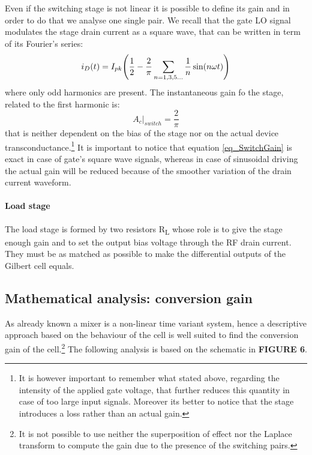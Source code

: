 Even if the switching stage is not linear it is possible to define its gain and in order to do that we analyse one single pair. We recall that the gate LO signal modulates the stage drain current as a square wave, that can be written in term of its Fourier's series:
\begin{equation}
 i_D(t)=I_{pk}\Bigg(\frac{1}{2}-\frac{2}{\pi} \sum_{n=1,3,5 \dots}^{} \frac{1}{n}\sin(n\omega t)\Bigg) \notag
\end{equation} 
where only odd harmonics are present. The instantaneous gain fo the stage, related to the first harmonic is:
\begin{equation}
\label{eq_SwitchGain}
A_c|_{switch} = \frac{2}{\pi}
\end{equation}
that is neither dependent on the bias of the stage nor on the actual device transconductance.\footnote{It is however important to remember what stated above, regarding the intensity of the applied gate voltage, that further reduces this quantity in case of too large input signals. Moreover its better to notice that the stage introduces a loss rather than an actual gain.} It is important to notice that equation \ref{eq_SwitchGain} is exact in case of gate's square wave signals, whereas in case of sinusoidal driving the actual gain will be reduced because of the smoother variation of the drain current waveform.

\paragraph{Load stage} 
The load stage is formed by two resistors R\textsubscript{L} whose role is to give the stage enough gain and to set the output bias voltage through the RF drain current. They must be as matched as possible to make the differential outputs of the Gilbert cell equals.


\subsection{Mathematical analysis: conversion gain}

As already known a mixer is a non-linear time variant system, hence a descriptive approach based on the behaviour of the cell is well suited to find the conversion gain of the cell.\footnote{It is not possible to use neither the superposition of effect nor the Laplace transform to compute the gain due to the presence of the switching pairs.} 
The following analysis is based on the schematic in \textbf{FIGURE 6}.

